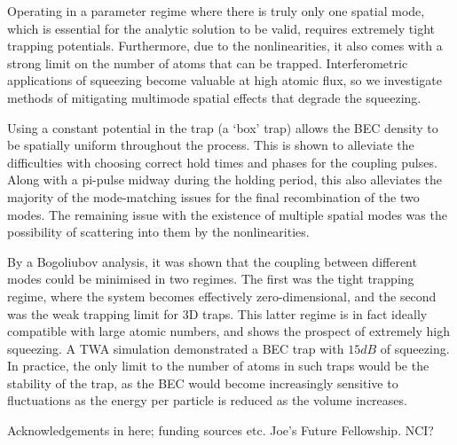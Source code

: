 \documentclass{iopart}
\begin{document}
Operating in a parameter regime where there is truly only one spatial mode, which is essential for the analytic solution to be valid, requires extremely tight trapping potentials.  Furthermore, due to the nonlinearities, it also comes with a strong limit on the number of atoms that can be trapped.  Interferometric applications of squeezing become valuable at high atomic flux, so we investigate methods of mitigating multimode spatial effects that degrade the squeezing.

Using a constant potential in the trap (a `box' trap) allows the BEC density to be spatially uniform throughout the process.  This is shown to alleviate the difficulties with choosing correct hold times and phases for the coupling pulses.  Along with a pi-pulse midway during the holding period, this also alleviates the majority of the mode-matching issues for the final recombination of the two modes.  The remaining issue with the existence of multiple spatial modes was the possibility of scattering into them by the nonlinearities.

By a Bogoliubov analysis, it was shown that the coupling between different modes could be minimised in two regimes.  The first was the tight trapping regime, where the system becomes effectively zero-dimensional, and the second was the weak trapping limit for 3D traps.  This latter regime is in fact ideally compatible with large atomic numbers, and shows the prospect of extremely high squeezing.  A TWA simulation demonstrated a BEC trap with $15dB$ of squeezing.  In practice, the only limit to the number of atoms in such traps would be the stability of the trap, as the BEC would become increasingly sensitive to fluctuations as the energy per particle is reduced as the volume increases.

\ack
Acknowledgements in here; funding sources etc.  Joe's Future Fellowship.  NCI?

\clearpage

\appendix
\end{document}
